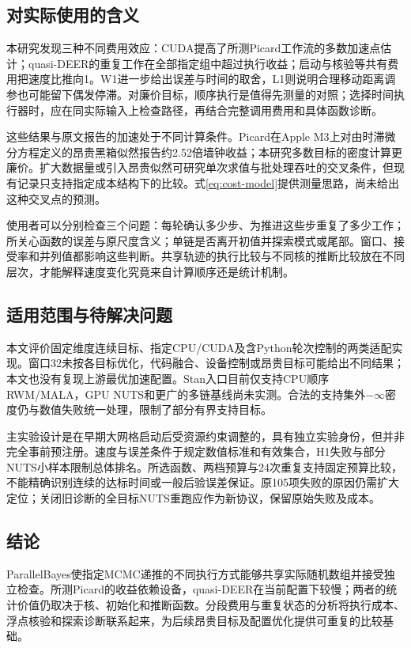 \documentclass[UTF8,fontset=fandol,zihao=-4]{ctexart}
\begin{document}
\subsection{对实际使用的含义}
本研究发现三种不同费用效应：CUDA提高了所测Picard工作流的多数加速点估计；quasi-DEER的重复工作在全部指定组中超过执行收益；启动与核验等共有费用把速度比推向1。W1进一步给出误差与时间的取舍，L1则说明合理移动距离调参也可能留下偶发停滞。对廉价目标，顺序执行是值得先测量的对照；选择时间执行器时，应在同实际输入上检查路径，再结合完整调用费用和具体函数诊断。

这些结果与原文报告的加速处于不同计算条件。Picard在Apple M3上对由时滞微分方程定义的昂贵黑箱似然报告约2.52倍墙钟收益\cite{grazzi}；本研究多数目标的密度计算更廉价。扩大数据量或引入昂贵似然可研究单次求值与批处理吞吐的交叉条件，但现有记录只支持指定成本结构下的比较。式\eqref{eq:cost-model}提供测量思路，尚未给出这种交叉点的预测。

使用者可以分别检查三个问题：每轮确认多少步、为推进这些步重复了多少工作；所关心函数的误差与原尺度含义；单链是否离开初值并探索模式或尾部。窗口、接受率和并列值都影响这些判断。共享轨迹的执行比较与不同核的推断比较放在不同层次，才能解释速度变化究竟来自计算顺序还是统计机制。

\subsection{适用范围与待解决问题}
本文评价固定维度连续目标、指定CPU/CUDA及含Python轮次控制的两类适配实现。窗口32未按各目标优化，代码融合、设备控制或昂贵目标可能给出不同结果；本文也没有复现上游最优加速配置。Stan入口目前仅支持CPU顺序RWM/MALA，GPU NUTS和更广的多链基线尚未实测。合法的支持集外$-\infty$密度仍与数值失败统一处理，限制了部分有界支持目标。

主实验设计是在早期大网格启动后受资源约束调整的，具有独立实验身份，但并非完全事前预注册。速度与误差条件于规定数值标准和有效集合，H1失败与部分NUTS小样本限制总体排名。所选函数、两档预算与24次重复支持固定预算比较，不能精确识别连续的达标时间或一般后验误差保证。原105项失败的原因仍需扩大定位；关闭旧诊断的全目标NUTS重跑应作为新协议，保留原始失败及成本。

\subsection{结论}
ParallelBayes使指定MCMC递推的不同执行方式能够共享实际随机数组并接受独立检查。所测Picard的收益依赖设备，quasi-DEER在当前配置下较慢；两者的统计价值仍取决于核、初始化和推断函数。分段费用与重复状态的分析将执行成本、浮点核验和探索诊断联系起来，为后续昂贵目标及配置优化提供可重复的比较基础。
\end{document}
